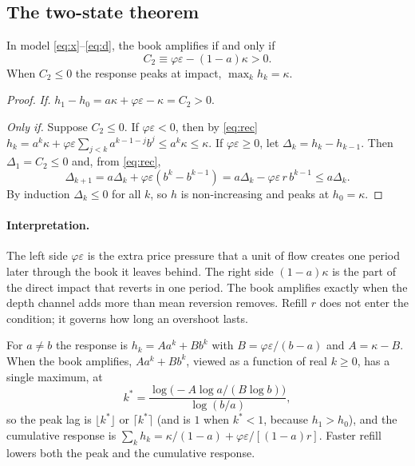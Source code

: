 \subsection{The two-state theorem}

\begin{theorem}\label{thm:t6}
In model \eqref{eq:x}--\eqref{eq:d}, the book amplifies if and only if
\[
C_2\equiv\varphi\varepsilon-(1-a)\kappa>0 .
\]
When $C_2\le0$ the response peaks at impact, $\max_kh_k=\kappa$.
\end{theorem}

\begin{proof}
\emph{If.} $h_1-h_0=a\kappa+\varphi\varepsilon-\kappa=C_2>0$.

\emph{Only if.} Suppose $C_2\le0$. If $\varphi\varepsilon<0$, then by \eqref{eq:rec} $h_k=a^k\kappa+\varphi\varepsilon\sum_{j<k}a^{k-1-j}b^j\le a^k\kappa\le\kappa$. If $\varphi\varepsilon\ge0$, let $\Delta_k=h_k-h_{k-1}$. Then $\Delta_1=C_2\le0$ and, from \eqref{eq:rec},
\[
\Delta_{k+1}=a\Delta_k+\varphi\varepsilon(b^{k}-b^{k-1})=a\Delta_k-\varphi\varepsilon\,r\,b^{k-1}\le a\Delta_k .
\]
By induction $\Delta_k\le0$ for all $k$, so $h$ is non-increasing and peaks at $h_0=\kappa$.
\end{proof}

\paragraph{Interpretation.} The left side $\varphi\varepsilon$ is the extra price pressure that a unit of flow creates one period later through the book it leaves behind. The right side $(1-a)\kappa$ is the part of the direct impact that reverts in one period. The book amplifies exactly when the depth channel adds more than mean reversion removes. Refill $r$ does not enter the condition; it governs how long an overshoot lasts.

\begin{proposition}\label{prop:shape}
For $a\neq b$ the response is $h_k=Aa^k+Bb^k$ with $B=\varphi\varepsilon/(b-a)$ and $A=\kappa-B$. When the book amplifies, $Aa^k+Bb^k$, viewed as a function of real $k\ge0$, has a single maximum, at
\[
k^*=\frac{\log\bigl(-A\log a/(B\log b)\bigr)}{\log(b/a)},
\]
so the peak lag is $\lfloor k^*\rfloor$ or $\lceil k^*\rceil$ (and is $1$ when $k^*<1$, because $h_1>h_0$), and the cumulative response is $\sum_kh_k=\kappa/(1-a)+\varphi\varepsilon/[(1-a)r]$. Faster refill lowers both the peak and the cumulative response.
\end{proposition}

